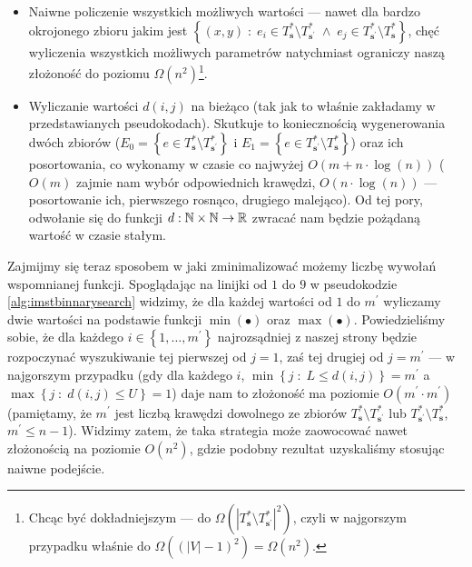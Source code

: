 {\begin{itemize}
	\item Naiwne policzenie wszystkich możliwych wartości --- nawet dla bardzo okrojonego zbioru jakim jest $\left\{ \left( x, y \right) \; : \; e_{i} \in T^{\ast}_{\textbf{s}} \setminus T^{\ast}_{\textbf{s}^{\prime}} \; \wedge \; e_{j} \in T^{\ast}_{\textbf{s}^{\prime}} \setminus T^{\ast}_{\textbf{s}} \right\}$, chęć wyliczenia wszystkich możliwych parametrów natychmiast ograniczy naszą złożoność do poziomu $\Omega \left( n^{2} \right)$\footnote{Chcąc być dokładniejszym --- do $\Omega \left( \left| T^{\ast}_{\textbf{s}} \setminus T^{\ast}_{\textbf{s}^{\prime}} \right|^{2} \right)$, czyli w najgorszym przypadku właśnie do $\Omega \left( \left( \left| V \right| - 1 \right)^{2} \right) = \Omega \left( n^{2} \right)$.}.
	\item Wyliczanie wartości $d \left( i, j \right)$ na bieżąco (tak jak to właśnie zakładamy w przedstawianych pseudokodach). Skutkuje to koniecznością wygenerowania dwóch zbiorów ($E_{0} = \left\{ e \in T^{\ast}_{\textbf{s}} \setminus T^{\ast}_{\textbf{s}^{\prime}} \right\}$ i $E_{1} = \left\{ e \in T^{\ast}_{\textbf{s}^{\prime}} \setminus T^{\ast}_{\textbf{s}} \right\}$) oraz ich posortowania, co wykonamy w czasie co najwyżej $O \left( m + n \cdot \log \left( n \right) \right)$ ($O \left( m \right)$ zajmie nam wybór odpowiednich krawędzi, $O \left( n \cdot \log \left( n \right) \right)$ --- posortowanie ich, pierwszego rosnąco, drugiego malejąco). Od tej pory, odwołanie się do funkcji $d: \mathbb{N} \times \mathbb{N} \rightarrow \mathbb{R}$ zwracać nam będzie pożądaną wartość w czasie stałym.
\end{itemize}

Zajmijmy się teraz sposobem w jaki zminimalizować możemy liczbę wywołań wspomnianej funkcji. Spoglądając na linijki od $1$ do $9$ w pseudokodzie \ref{alg:imstbinnarysearch} widzimy, że dla każdej wartości od $1$ do $m^{\prime}$ wyliczamy dwie wartości na podstawie funkcji $\min \left( \bullet \right)$ oraz $\max \left( \bullet \right)$. Powiedzieliśmy sobie, że dla każdego $i \in \left\{ 1, \dots, m^{\prime} \right\}$ najrozsądniej z naszej strony będzie rozpoczynać wyszukiwanie tej pierwszej od $j = 1$, zaś tej drugiej od $j = m^{\prime}$ --- w najgorszym przypadku (gdy dla każdego $i$, $\min \left\{ j \; : \; L \leqslant d \left( i, j \right) \right\} = m^{\prime}$ a $\max \left\{ j \; : \; d \left( i, j \right) \leqslant U \right\} = 1$) daje nam to złożoność ma poziomie $O \left( m^{\prime} \cdot m^{\prime} \right)$ (pamiętamy, że $m^{\prime}$ jest liczbą krawędzi dowolnego ze zbiorów $T^{\ast}_{\textbf{s}} \setminus T^{\ast}_{\textbf{s}^{\prime}}$ lub $T^{\ast}_{\textbf{s}^{\prime}} \setminus T^{\ast}_{\textbf{s}}$, $m^{\prime} \leqslant n - 1$). Widzimy zatem, że taka strategia może zaowocować nawet złożonością na poziomie $O \left( n^{2} \right)$, gdzie podobny rezultat uzyskaliśmy stosując naiwne podejście.

}
